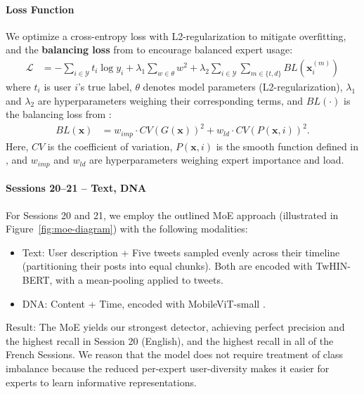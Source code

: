 \documentclass[conference]{IEEEtran}
\begin{document}
\paragraph{Loss Function}
We optimize a cross-entropy loss 
with L2-regularization to mitigate overfitting,
and the \textbf{balancing loss} from \citet{shazeer2017outrageously}
to encourage balanced expert usage:
\begin{align}
\mathcal{L} &= -\sum_{i \in \mathcal{Y}} t_i \log y_i + \lambda_1 \sum_{w \in \theta} w^2 + \lambda_2 \sum_{i \in \mathcal{Y}} \sum_{m \in \{t, d\}}^{} BL(\mathbf{x}_i^{(m)})
\end{align}
where $t_i$ is user $i$'s true label,
\(\theta \) denotes model parameters (L2-regularization),
$\lambda_1$ and $\lambda_2$ are hyperparameters weighing their corresponding terms,
and \( BL(\cdot) \) is the balancing loss from \citet{shazeer2017outrageously}:
\begin{align}
BL(\mathbf{x}) &= w_{imp} \cdot CV(G(\mathbf{x}))^2 + w_{ld} \cdot CV(P(\mathbf{x}, i))^2.
\end{align}
Here, \( CV \) is the coefficient of variation, \(P(\mathbf{x}, i) \) is the smooth function defined in 
\citet{shazeer2017outrageously}, and \(w_{imp} \) and \(w_{ld} \) are 
hyperparameters weighing expert importance and load. 

\paragraph{\textbf{Sessions 20–21} – Text, DNA}
For Sessions 20 and 21, we employ the outlined 
MoE approach (illustrated in Figure~\ref{fig:moe-diagram}) 
with the following modalities:
\begin{itemize}
    \item Text: User description + 
    Five tweets sampled evenly across their timeline 
    (partitioning their posts into equal chunks).
    Both are encoded with TwHIN-BERT, with a mean-pooling applied to tweets.
    \item DNA: Content + Time, encoded with MobileViT-small \citep{mehta2021mobilevit}.
\end{itemize}

Result: The MoE yields our strongest detector, 
achieving perfect precision and the highest recall in Session 20 (English), 
and the highest recall in all of the French Sessions.
We reason that the model does not require treatment 
of class imbalance because the reduced per-expert user-diversity
makes it easier for experts to learn informative representations.
\end{document}
